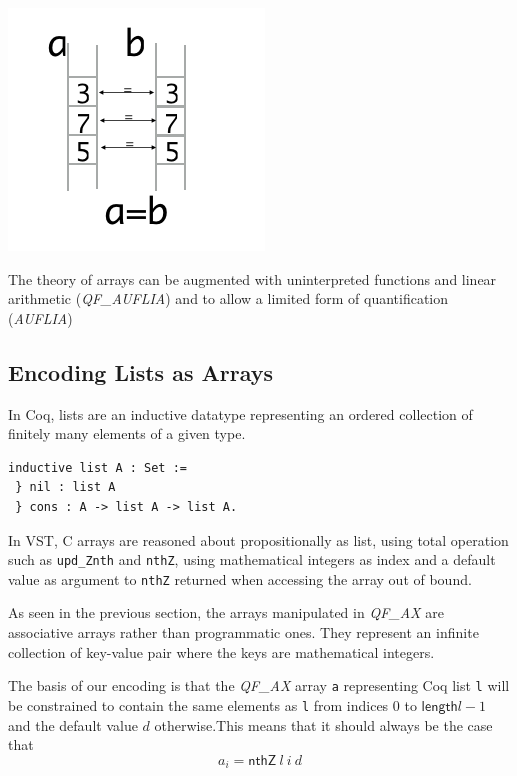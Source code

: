 \documentclass[onecolumn, preprint]{sigplanconf}
\begin{document}
\begin{enumerate}
\begin{multicols}{2}
  \includegraphics[scale=0.5]{pictures/axiom3.png}
  \end{multicols}
  \end{enumerate}
  

The theory of arrays can be augmented with uninterpreted functions and linear arithmetic (\emph{QF\_AUFLIA}) and to allow a limited form of quantification (\emph{AUFLIA})



\subsection{Encoding Lists as Arrays}

In Coq, lists are an inductive datatype representing an ordered collection of finitely many elements of a given type. 
\begin{lstlisting}
inductive list A : Set :=
 } nil : list A
 } cons : A -> list A -> list A.
\end{lstlisting}

In VST, C arrays are reasoned about propositionally as list, using total operation such as \texttt{upd\_Znth} and \texttt{nthZ}, using mathematical integers as index and a default value as argument to \texttt{nthZ} returned when accessing the array out of bound. 

As seen in the previous section, the arrays manipulated in \emph{QF\_AX} are associative arrays rather than programmatic ones. They represent an infinite collection of key-value pair where the keys are mathematical integers. 

The basis of our encoding is that the \emph{QF\_AX} array \texttt{a} representing Coq list \texttt{l} will be constrained to contain the same elements as \texttt{l} from indices $0$ to $\mathsf{length} l - 1$ and the default value $d$ otherwise.This means that it should always be the case that
$$ a_i = \textsf{nthZ}\ l\ i\ d$$
\end{document}
